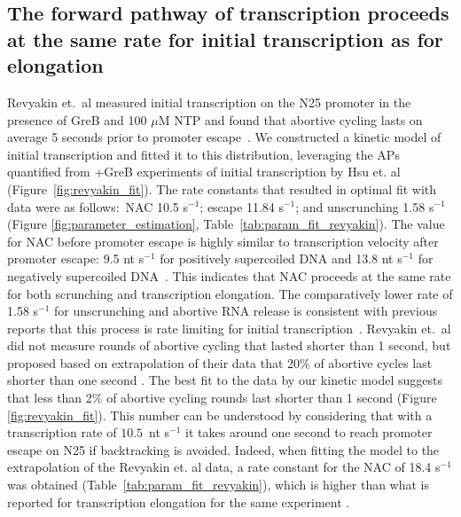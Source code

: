 %
\subsection{The forward pathway of transcription proceeds at the same rate
for initial transcription as for elongation}
Revyakin et.\ al measured initial transcription on the N25 promoter in the
presence of GreB and 100 $\mu$M NTP and found that abortive cycling lasts on
average 5 seconds prior to promoter escape~\cite{revyakin_abortive_2006}. We
constructed a kinetic model of initial transcription and fitted it to this
distribution, leveraging the APs quantified from +GreB experiments of initial
transcription by Hsu et. al~\cite{hsu_initial_2006}
(Figure~\ref{fig:revyakin_fit}). The rate constants that resulted in 
optimal fit with data were as follows:~NAC 10.5 s$^{-1}$; escape
11.84 s$^{-1}$; and unscrunching 1.58 s$^{-1}$ (Figure
\ref{fig:parameter_estimation}, Table~\ref{tab:param_fit_revyakin}). The value
for NAC before promoter escape is highly similar to transcription velocity
after promoter escape: 9.5 nt s$^{-1}$ for positively supercoiled DNA and 13.8
nt s$^{-1}$ for negatively supercoiled DNA~\cite{revyakin_abortive_2006}. This
indicates that NAC proceeds at the same rate for both scrunching and
transcription elongation. The comparatively lower rate of 1.58 s$^{-1}$ for
unscrunching and abortive RNA release is consistent with previous reports that
this process is rate limiting for initial
transcription~\cite{margeat_direct_2006, revyakin_abortive_2006}. Revyakin
et.\ al did not measure rounds of abortive cycling that lasted shorter than 1
second, but proposed based on extrapolation of their data that 20\% of
abortive cycles last shorter than one second \cite{revyakin_abortive_2006}.
The best fit to the data by our kinetic model suggests that less than 2\% of
abortive cycling rounds last shorter than 1 second (Figure
\ref{fig:revyakin_fit}). This number can be understood by considering that
with a transcription rate of $10.5$~nt s$^{-1}$ it takes around one second to
reach promoter escape on N25 if backtracking is avoided. Indeed, when fitting
the model to the extrapolation of the Revyakin et. al data, a rate constant
for the NAC of 18.4 s$^{-1}$ was obtained
(Table~\ref{tab:param_fit_revyakin}), which is higher than what is reported
for transcription elongation for the same experiment
\cite{revyakin_abortive_2006}.

